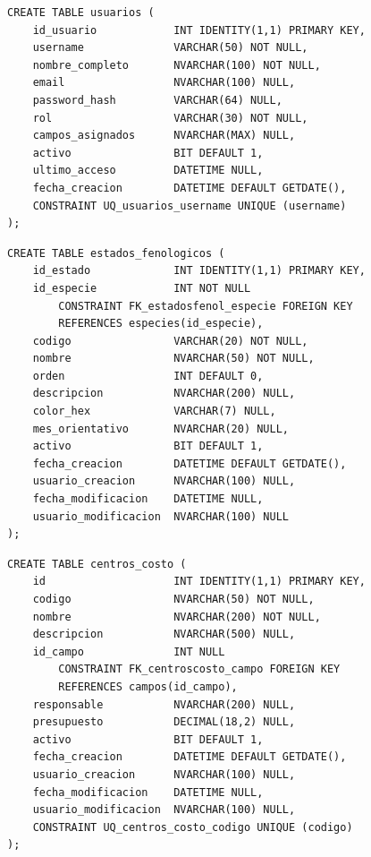 \documentclass[12pt,a4paper,twoside]{report}
\begin{document}
\begin{lstlisting}[style=sqlstyle, caption={usuarios}]
CREATE TABLE usuarios (
    id_usuario            INT IDENTITY(1,1) PRIMARY KEY,
    username              VARCHAR(50) NOT NULL,
    nombre_completo       NVARCHAR(100) NOT NULL,
    email                 NVARCHAR(100) NULL,
    password_hash         VARCHAR(64) NULL,
    rol                   VARCHAR(30) NOT NULL,
    campos_asignados      NVARCHAR(MAX) NULL,
    activo                BIT DEFAULT 1,
    ultimo_acceso         DATETIME NULL,
    fecha_creacion        DATETIME DEFAULT GETDATE(),
    CONSTRAINT UQ_usuarios_username UNIQUE (username)
);
\end{lstlisting}

\begin{lstlisting}[style=sqlstyle, caption={estados\_fenologicos}]
CREATE TABLE estados_fenologicos (
    id_estado             INT IDENTITY(1,1) PRIMARY KEY,
    id_especie            INT NOT NULL
        CONSTRAINT FK_estadosfenol_especie FOREIGN KEY
        REFERENCES especies(id_especie),
    codigo                VARCHAR(20) NOT NULL,
    nombre                NVARCHAR(50) NOT NULL,
    orden                 INT DEFAULT 0,
    descripcion           NVARCHAR(200) NULL,
    color_hex             VARCHAR(7) NULL,
    mes_orientativo       NVARCHAR(20) NULL,
    activo                BIT DEFAULT 1,
    fecha_creacion        DATETIME DEFAULT GETDATE(),
    usuario_creacion      NVARCHAR(100) NULL,
    fecha_modificacion    DATETIME NULL,
    usuario_modificacion  NVARCHAR(100) NULL
);
\end{lstlisting}

\begin{lstlisting}[style=sqlstyle, caption={centros\_costo}]
CREATE TABLE centros_costo (
    id                    INT IDENTITY(1,1) PRIMARY KEY,
    codigo                NVARCHAR(50) NOT NULL,
    nombre                NVARCHAR(200) NOT NULL,
    descripcion           NVARCHAR(500) NULL,
    id_campo              INT NULL
        CONSTRAINT FK_centroscosto_campo FOREIGN KEY
        REFERENCES campos(id_campo),
    responsable           NVARCHAR(200) NULL,
    presupuesto           DECIMAL(18,2) NULL,
    activo                BIT DEFAULT 1,
    fecha_creacion        DATETIME DEFAULT GETDATE(),
    usuario_creacion      NVARCHAR(100) NULL,
    fecha_modificacion    DATETIME NULL,
    usuario_modificacion  NVARCHAR(100) NULL,
    CONSTRAINT UQ_centros_costo_codigo UNIQUE (codigo)
);
\end{lstlisting}
\end{document}
